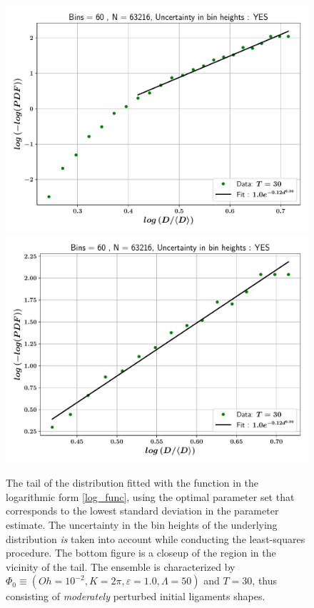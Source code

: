 
\begin{figure}
\centering
\includegraphics{plots/drop_stats/log_tail_fit_uncertainty_yes.pdf} \\
\includegraphics{plots/drop_stats/log_zoom_tail_fit_uncertainty_yes.pdf} \\ 
\caption{
	The tail of the distribution fitted with the function 
	in the logarithmic form \eqref{log_func}, using the optimal parameter
	set that corresponds to the lowest standard deviation in the parameter estimate.
	The uncertainty in the bin heights of the underlying distribution \textit{is} 
	taken into account while conducting the least-squares procedure. 
	The bottom figure is a closeup of the region in the vicinity of the tail.
	The ensemble is characterized by $\Phi_0 \equiv \left( Oh = 10^{-2}, K = 2\pi 
	, \varepsilon = 1.0 , \Lambda = 50 \right)$ and $T = 30$, 
	thus consisting of \textit{moderately} perturbed initial ligaments shapes. 
	}
\label{log_fits_with}
\end{figure}

